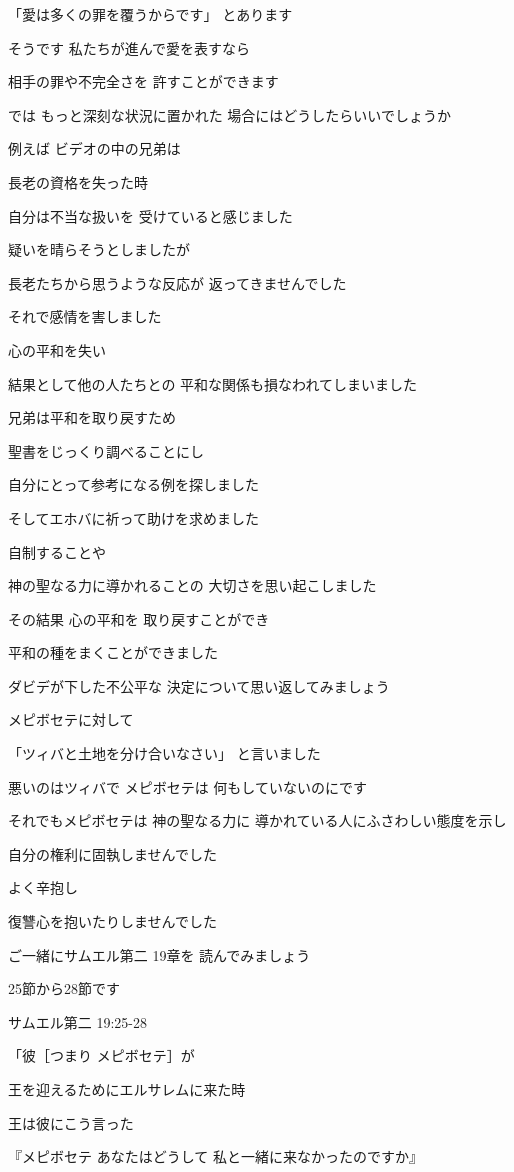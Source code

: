 \documentclass[twocolumn]{jsarticle}
\begin{document}
「愛は多くの罪を覆うからです」
とあります

そうです 私たちが進んで愛を表すなら

相手の罪や不完全さを
許すことができます

では もっと深刻な状況に置かれた
場合にはどうしたらいいでしょうか

例えば ビデオの中の兄弟は

長老の資格を失った時

自分は不当な扱いを
受けていると感じました

疑いを晴らそうとしましたが

長老たちから思うような反応が
返ってきませんでした

それで感情を害しました

心の平和を失い

結果として他の人たちとの
平和な関係も損なわれてしまいました

兄弟は平和を取り戻すため

聖書をじっくり調べることにし

自分にとって参考になる例を探しました

そしてエホバに祈って助けを求めました

自制することや

神の聖なる力に導かれることの
大切さを思い起こしました

その結果 心の平和を
取り戻すことができ

平和の種をまくことができました

ダビデが下した不公平な
決定について思い返してみましょう

メピボセテに対して

「ツィバと土地を分け合いなさい」
と言いました

悪いのはツィバで メピボセテは
何もしていないのにです

それでもメピボセテは 神の聖なる力に
導かれている人にふさわしい態度を示し 

自分の権利に固執しませんでした

よく辛抱し

復讐心を抱いたりしませんでした

ご一緒にサムエル第二 19章を
読んでみましょう

25節から28節です

サムエル第二 19:25-28

「彼［つまり メピボセテ］が

王を迎えるためにエルサレムに来た時

王は彼にこう言った

『メピボセテ あなたはどうして
私と一緒に来なかったのですか』
\end{document}
